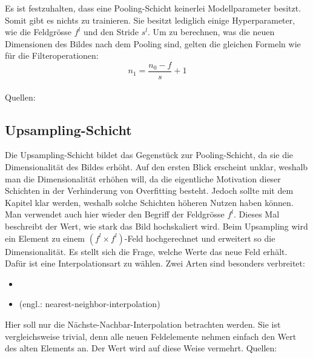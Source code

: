\para{}
Es ist festzuhalten, dass eine Pooling-Schicht keinerlei Modellparameter
besitzt. Somit gibt es nichts zu trainieren. Sie besitzt lediglich einige
Hyperparameter, wie die Feldgrösse $f^l$ und den Stride $s^l$.
\para{}
Um zu berechnen, was die neuen Dimensionen des Bildes nach dem Pooling sind, gelten die
gleichen Formeln wie für die Filteroperationen:
\\
\begin{equation}
  n_1 = \frac{n_0 - f}{s} + 1
\end{equation}
\\
\para{}
Quellen: \cite{deeplearning.ai:cnn} \cite{Goodfellow-et-al-2016}

\subsection{Upsampling-Schicht}
Die Upsampling-Schicht bildet das Gegenstück zur Pooling-Schicht, da sie die
Dimensionalität des Bildes erhöht. Auf den ersten Blick erscheint unklar,
weshalb man die Dimensionalität erhöhen will, da die eigentliche
Motivation dieser Schichten in der Verhinderung von Overfitting besteht. Jedoch
sollte mit dem Kapitel  klar werden, weshalb solche Schichten
höheren Nutzen haben können.
\para{}
Man verwendet auch hier wieder den Begriff der Feldgrösse $f^l$. Dieses Mal
beschreibt der Wert, wie stark das Bild hochskaliert wird. Beim Upsampling
wird ein Element zu einem $(f^l \times f^l)$-Feld hochgerechnet und erweitert so die
Dimensionalität.
\para{}
Es stellt sich die Frage, welche Werte das neue Feld erhält.
Dafür ist eine Interpolationsart zu wählen.
Zwei Arten sind besonders verbreitet:
\begin{itemize}
\item{}
\item{ (engl.: nearest-neighbor-interpolation)}
\end{itemize}
Hier soll nur die Nächste-Nachbar-Interpolation betrachten werden. Sie ist
vergleichsweise trivial, denn alle neuen Feldelemente nehmen einfach den Wert des alten
Elements an. Der Wert wird auf diese Weise vermehrt.
\para{}
Quellen: \cite{deeplearning.ai:cnn} \cite{Goodfellow-et-al-2016}

\pagebreak
